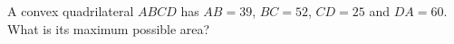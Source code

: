 A convex quadrilateral $ABCD$ has $AB=39$, $BC=52$, $CD=25$ and $DA=60$. What is its maximum possible area?
